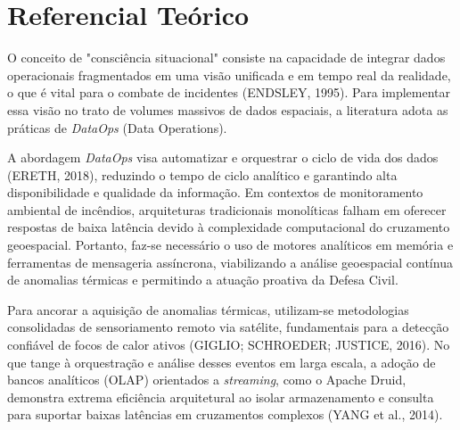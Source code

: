 \section*{Referencial Teórico}

O conceito de "consciência situacional" consiste na capacidade de integrar dados operacionais fragmentados em uma visão unificada e em tempo real da realidade, o que é vital para o combate de incidentes (ENDSLEY, 1995). Para implementar essa visão no trato de volumes massivos de dados espaciais, a literatura adota as práticas de \textit{DataOps} (Data Operations). 

A abordagem \textit{DataOps} visa automatizar e orquestrar o ciclo de vida dos dados (ERETH, 2018), reduzindo o tempo de ciclo analítico e garantindo alta disponibilidade e qualidade da informação. Em contextos de monitoramento ambiental de incêndios, arquiteturas tradicionais monolíticas falham em oferecer respostas de baixa latência devido à complexidade computacional do cruzamento geoespacial. Portanto, faz-se necessário o uso de motores analíticos em memória e ferramentas de mensageria assíncrona, viabilizando a análise geoespacial contínua de anomalias térmicas e permitindo a atuação proativa da Defesa Civil.

Para ancorar a aquisição de anomalias térmicas, utilizam-se metodologias consolidadas de sensoriamento remoto via satélite, fundamentais para a detecção confiável de focos de calor ativos (GIGLIO; SCHROEDER; JUSTICE, 2016). No que tange à orquestração e análise desses eventos em larga escala, a adoção de bancos analíticos (OLAP) orientados a \textit{streaming}, como o Apache Druid, demonstra extrema eficiência arquitetural ao isolar armazenamento e consulta para suportar baixas latências em cruzamentos complexos (YANG et al., 2014).
